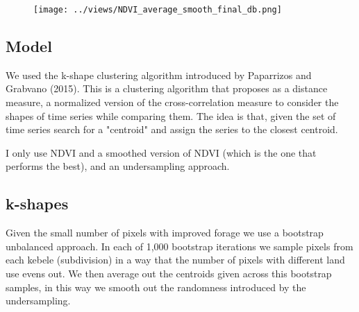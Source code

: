 \documentclass[10pt,a4paper,onecolumn]{article}
\begin{document}
  \begin{figure}[H] \centering
            \captionsetup{justification=centering}
              \texttt{[image: ../views/NDVI\_average\_smooth\_final\_db.png]}
              
 \end{figure}



              




\subsection{Model}


We used the k-shape clustering algorithm introduced by Paparrizos and Grabvano (2015). This is a clustering algorithm that proposes as a distance measure, a normalized version of the cross-correlation measure to consider the shapes of time series while comparing them. The idea is that, given the set of time series search for a "centroid" and assign the series to the closest centroid. 

I only use NDVI and a smoothed version of NDVI (which is the one that performs the best), and an undersampling approach. 







\subsection{k-shapes}


Given the small number of pixels with improved forage we use a bootstrap unbalanced approach. In each of 1,000 bootstrap iterations we  sample pixels from each kebele (subdivision) in a way that the number of pixels with different land use evens out. We then average out the centroids given across this bootstrap samples, in this way we smooth out the randomness introduced by the undersampling. 
\end{document}
